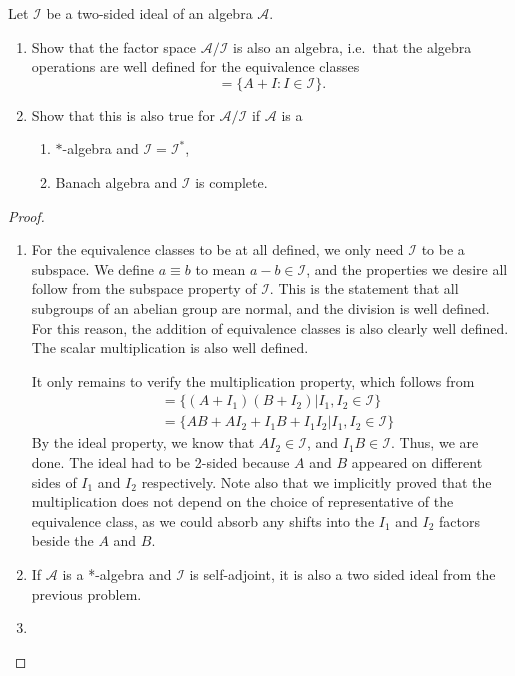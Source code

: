 \begin{Problem}
	Let $\mathcal{I}$ be a two-sided ideal of an algebra $\mathcal{A}$.
	
	\begin{enumerate}
		\item Show that the factor space $\mathcal{A}/\mathcal{I}$ is also an algebra, i.e.\ that the algebra operations are well defined for the equivalence classes
		\begin{equation}
			[A] = \{ A + I : I \in \mathcal{I} \}.
		\end{equation}
		
		\item Show that this is also true for $\mathcal{A}/\mathcal{I}$ if $\mathcal{A}$ is a
		\begin{enumerate}
			\item $*$-algebra and $\mathcal{I} = \mathcal{I}^*$,
			\item Banach algebra and $\mathcal{I}$ is complete.
		\end{enumerate}
	\end{enumerate}
\end{Problem}
\begin{proof}
	\begin{enumerate}
		\item For the equivalence classes to be at all defined, we only need $ \mathcal{I}$ to be a subspace. We define $a\equiv b$ to mean $a-b\in \mathcal{I}$, and the properties we desire all follow from the subspace property of $\mathcal{I}$. This is the statement that all subgroups of an abelian group are normal, and the division is well defined. For this reason, the addition of equivalence classes is also clearly well defined. The scalar multiplication is also well defined.

			It only remains to verify the multiplication property, which follows from
			\begin{align*}
				[A][B] &= \{(A+I_1)(B+I_2)|I_1,I_2\in \mathcal{I}\}  \\
				&= \{AB + A I_2 + I_1B + I_1I_2|I_1,I_2\in \mathcal{I}\} 
			\end{align*}
			By the ideal property, we know that $A I_2\in \mathcal{I}$, and $I_1B\in \mathcal{I}$. Thus, we are done. The ideal had to be 2-sided because $A$ and $B$ appeared on different sides of $I_1$ and $I_2$ respectively. Note also that we implicitly proved that the multiplication does not depend on the choice of representative of the equivalence class, as we could absorb any shifts into the $I_1$ and $I_2$ factors beside the $A$ and $B$.
		\item If $\mathcal{A}$ is a *-algebra and $\mathcal{I}$ is self-adjoint, it is also a two sided ideal from the previous problem.
		\item 
	\end{enumerate}
\end{proof}
